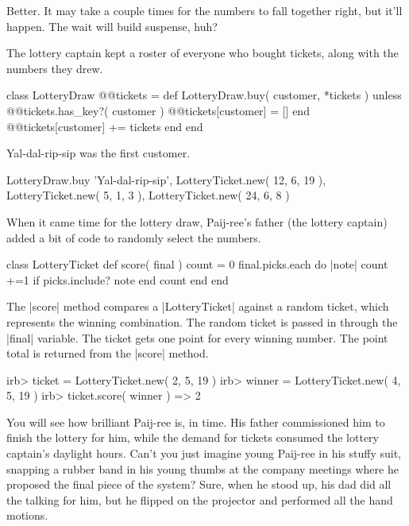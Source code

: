 \documentclass[12pt,twoside]{report}
\begin{document}
Better.  It may take a couple times for the numbers to fall together
right, but it'll happen.  The wait will build suspense, huh?

The lottery captain kept a roster of everyone who bought tickets,
along with the numbers they drew.


\begin{rubycode}

 class LotteryDraw
   @@tickets = {}
   def LotteryDraw.buy( customer, *tickets )
     unless @@tickets.has_key?( customer )
       @@tickets[customer] = []
     end
     @@tickets[customer] += tickets
   end
 end

\end{rubycode}


Yal-dal-rip-sip was the first customer.


\begin{rubycode}

 LotteryDraw.buy 'Yal-dal-rip-sip',
     LotteryTicket.new( 12, 6, 19 ),
     LotteryTicket.new( 5, 1, 3 ),
     LotteryTicket.new( 24, 6, 8 )

\end{rubycode}


When it came time for the lottery draw, Paij-ree's father (the lottery
captain) added a bit of code to randomly select the numbers.


\begin{rubycode}

 class LotteryTicket
   def score( final )
     count = 0
     final.picks.each do |note|
       count +=1 if picks.include? note
     end
     count
   end
 end

\end{rubycode}


The \rubyinline|score| method compares a
\rubyinline|LotteryTicket| against a random ticket,
which represents the winning combination.  The random ticket is passed
in through the \rubyinline|final| variable.  The
ticket gets one point for every winning number.  The point total is
returned from the \rubyinline|score| method.


\begin{consolecode}

 irb> ticket = LotteryTicket.new( 2, 5, 19 )
 irb> winner = LotteryTicket.new( 4, 5, 19 )
 irb> ticket.score( winner )
   => 2

\end{consolecode}


You will see how brilliant Paij-ree is, in time.  His father
commissioned him to finish the lottery for him, while the demand for
tickets consumed the lottery captain's daylight hours.  Can't you just
imagine young Paij-ree in his stuffy suit, snapping a rubber band in
his young thumbs at the company meetings where he proposed the final
piece of the system?  Sure, when he stood up, his dad did all the
talking for him, but he flipped on the projector and performed all the
hand motions.
\end{document}
